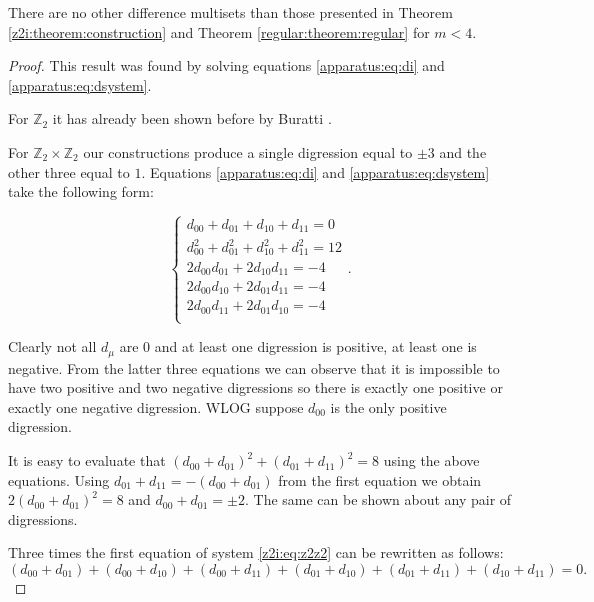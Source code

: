 \begin{theorem}
    There are no other difference multisets than those presented in Theorem \ref{z2i:theorem:construction} and Theorem \ref{regular:theorem:regular} for $m < 4$.
\end{theorem}

\begin{proof}
    This result was found by solving equations \eqref{apparatus:eq:di} and \eqref{apparatus:eq:dsystem}.
    
    For $\mathbb Z_2$ it has already been shown before by Buratti \cite{buratti1999old}.
    
    For $\mathbb Z_2 \times \mathbb Z_2$ our constructions produce a single digression equal to $\pm 3$ and the other three equal to $1$. Equations \eqref{apparatus:eq:di} and \eqref{apparatus:eq:dsystem} take the following form:
    
    \begin{equation}
        \label{z2i:eq:z2z2}
        \begin{cases}
            d_{00} + d_{01} + d_{10} + d_{11} = 0 \\
            d_{00}^2 + d_{01}^2 + d_{10}^2 + d_{11}^2 = 12 \\
            2 d_{00}d_{01} + 2 d_{10}d_{11} = -4 \\
            2 d_{00}d_{10} + 2 d_{01}d_{11} = -4 \\
            2 d_{00}d_{11} + 2 d_{01}d_{10} = -4 \\
        \end{cases}.
    \end{equation}
    
    Clearly not all $d_\mu$ are $0$ and at least one digression is positive, at least one is negative. From the latter three equations we can observe that it is impossible to have two positive and two negative digressions so there is exactly one positive or exactly one negative digression. WLOG suppose $d_{00}$ is the only positive digression.
    
    It is easy to evaluate that $(d_{00}+d_{01})^2+(d_{01}+d_{11})^2=8$ using the above equations. Using $d_{01}+d_{11} = -(d_{00}+d_{01})$ from the first equation we obtain $2(d_{00}+d_{01})^2=8$ and $d_{00}+d_{01} = \pm 2$. The same can be shown about any pair of digressions.
    
    Three times the first equation of system \eqref{z2i:eq:z2z2} can be rewritten as follows:
    \begin{equation*}
        (d_{00}+d_{01}) + (d_{00}+d_{10}) + (d_{00}+d_{11}) + (d_{01}+d_{10}) + (d_{01}+d_{11}) + (d_{10}+d_{11}) = 0.
    \end{equation*}
    

\end{proof}
